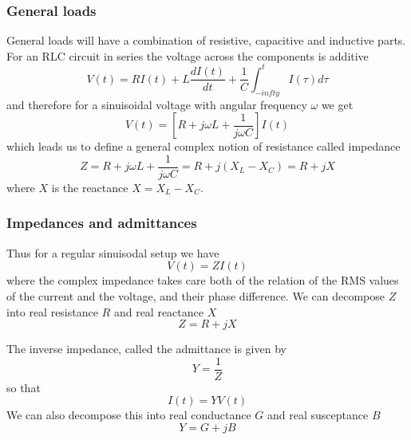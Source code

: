 \documentclass[10pt,aspectratio=169,dvipsnames]{beamer}
\begin{document}
\begin{frame}
  \frametitle{General loads}

  General loads will have a combination of resistive, capacitive and
  inductive parts. For an RLC circuit in series the voltage across the
  components is additive
  \begin{equation*}
    V(t) = R I(t) + L\frac{dI(t)}{dt} + \frac{1}{C} \int_{-infty}^t I(\tau) d\tau
  \end{equation*}
  and therefore for a sinuisoidal voltage with angular frequency $\omega$ we get
  \begin{equation*}
    V(t) = \left[ R + j\omega L + \frac{1}{j\omega C} \right] I(t)
  \end{equation*}
  which leads us to define a general complex notion of resistance called \alert{impedance}
  \begin{equation*}
    Z =  R + j\omega L + \frac{1}{j\omega C} = R + j(X_L - X_C) = R + jX
  \end{equation*}
  where $X$ is the reactance $X = X_L - X_C$.
\end{frame}


\begin{frame}
  \frametitle{Impedances and admittances}

  Thus for a regular sinuisodal setup we have
  \begin{equation*}
    V(t) = ZI(t)
  \end{equation*}
  where the complex \alert{impedance} takes care both of the relation
  of the RMS values of the current and the voltage, and their phase
  difference. We can decompose $Z$ into real resistance $R$ and real reactance $X$
  \begin{equation*}
    Z = R + jX
  \end{equation*}

  The inverse impedance, called the \alert{admittance} is given by
  \begin{equation*}
    Y = \frac{1}{Z}
  \end{equation*}
  so that
  \begin{equation*}
    I(t) = Y V(t)
  \end{equation*}
  We can also decompose this into real conductance $G$ and real susceptance $B$
  \begin{equation*}
    Y = G + jB
  \end{equation*}


\end{frame}
\end{document}
